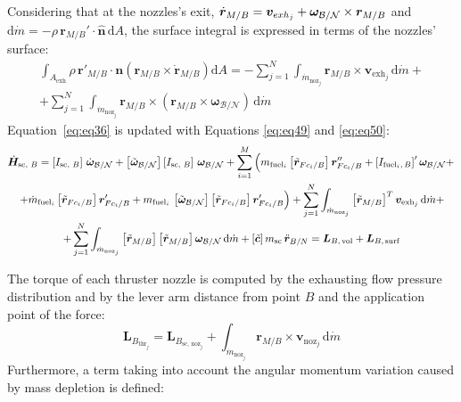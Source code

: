 Considering that at the nozzles's exit, $\dot{\bm{r}}_{M/B} = \bm{v}_{exh_j} + \bm{\omega}_{\cal{B}/\cal{N}} \times \bm{r}_{M/B}$ and $\text{d}\dot{m} =- \rho\,\bm{r}_{M/B}'\cdot\hat{\bm{n}} \,\text{d}A$, the surface integral is expressed in terms of the nozzles' surface:
\begin{multline}\label{eq:eq50}
	\int_{A_{\text{exh}}} \rho\,\bm{r}'_{M/B}\cdot\bm{n} \left(\bm{r}_{M/B} \times \dot{\bm{r}}_{M/B}\right)\text{d}A =- \sum_{j=1}^{N}\int_{\dot{m}_{\text{noz}_j}}\bm{r}_{M/B} \times  \bm{v}_{\text{exh}_j}\,\text{d}\dot{m}+\\
	+ \sum_{j=1}^{N}\int_{\dot{m}_{\text{noz}_j}}\bm{r}_{M/B} \times\left( \bm{r}_{M/B}\times \bm{\omega} _{\mathcal{B}/\mathcal{N}}\right)\,\text{d}\dot{m}
\end{multline}
Equation~\eqref{eq:eq36} is updated with Equations \eqref{eq:eq49} and \eqref{eq:eq50}:
\begin{multline}
	\dot{\bm{H}}_{\text{sc, }B} = \left[I_{\text{sc, }B}\right]\,\dot{\bm{\omega}}_{\cal{B}/\cal{N}} + \left[\tilde{\bm{\omega}}_{\cal{B}/\cal{N}}\right]\left[I_{\text{sc, }B}\right]\,\bm{\omega}_{\cal{B}/\cal{N}} + \sum_{i=1}^{M}\left(m_{\text{fuel}_i}\left[\tilde{\bm{r}}_{Fc_i/B}\right] \bm{r}''_{Fc_i/B} + \left[I_{\text{fuel}_i,\,B}\right]' \bm{\omega}_{\cal{B}/\cal{N}}
	+\right. \\
	\left.+ \dot{m}_{\text{fuel}_i} \left[\tilde{\bm{r}}_{Fc_i/B}\right]\bm{r}'_{Fc_i/B}+  {m}_{\text{fuel}_i}\,\left[\tilde{\bm{\omega}}_{\mathcal{B}/\mathcal{N}}\right] \left[\tilde{\bm{r}}_{Fc_i/B}\right] \bm{r}'_{Fc_i/B}\right)
	+\sum_{j=1}^{N}\int_{\dot{m}_{\text{noz}_j}}\left[\tilde{\bm{r}}_{M/B}\right] ^T  \bm{v}_{\text{exh}_j}\,\text{d}\dot{m}+\\
	+\sum_{j=1}^{N}\int_{\dot{m}_{\text{noz}_j}}\left[\tilde{\bm{r}}_{M/B}\right]   \left[\tilde{\bm{r}}_{M/B}\right]  \bm{\omega} _{\mathcal{B}/\mathcal{N}} \,\text{d}\dot{m} +\left[\tilde{\bm{c}}\right] m_{\text{sc}}\,\ddot{\bm{r}}_{B/N}=\bm{L}_{B,\,\text{vol}}+\bm{L}_{B,\,\text{surf}} 
\end{multline}

The torque of each thruster nozzle is computed by the exhausting flow pressure distribution and by the lever arm distance from point $B$ and the application point of the force:
\begin{equation}
	\bm{L}_{B_{\text{thr}_j}} = \bm{L}_{B_{\text{sc, noz}_j}} + \int_{\dot{m}_{\text{noz}_j}}\bm{r}_{M/B} \times  \bm{v}_{\text{noz}_j}\,\text{d}\dot{m}
\end{equation}
Furthermore, a term taking into account the angular momentum variation caused by mass depletion is defined:

